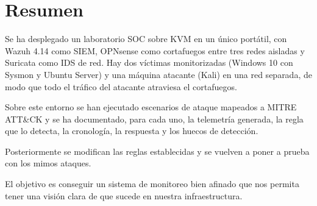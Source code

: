 \chapter*{Resumen}

Se ha desplegado un laboratorio SOC sobre KVM en un único portátil, con
Wazuh 4.14 como SIEM, OPNsense como cortafuegos entre tres redes
aisladas y Suricata como IDS de red. Hay dos víctimas monitorizadas
(Windows 10 con Sysmon y Ubuntu Server) y una máquina atacante (Kali) en una red
separada, de modo que todo el tráfico del atacante atraviesa el cortafuegos.

Sobre este entorno se han ejecutado escenarios de ataque mapeados a MITRE
ATT\&CK y se ha documentado, para cada uno, la telemetría generada, la regla que
lo detecta, la cronología, la respuesta y los huecos de detección.

Posteriormente se modifican las reglas establecidas y se vuelven a poner a prueba con los mimos ataques. 

El objetivo es conseguir un sistema de monitoreo bien afinado que nos permita tener una visión clara de que sucede en nuestra infraestructura.

